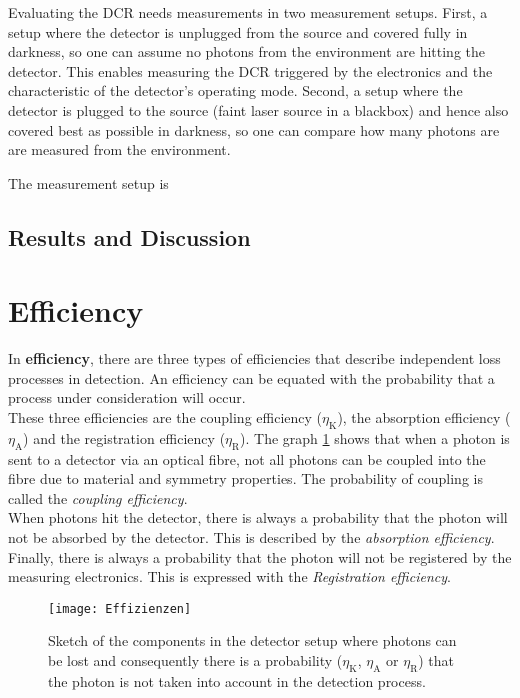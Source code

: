 Evaluating the DCR needs measurements in two measurement setups.
First, a setup where the detector is unplugged from the source and covered fully in darkness, so one can assume no
photons from the environment are hitting the detector.
This enables measuring the DCR triggered by the electronics and the characteristic of the detector's operating mode.
Second, a setup where the detector is plugged to the source (faint laser source in a blackbox) and hence also
covered best as possible in darkness, so one can compare how many photons are are measured from the environment.

The measurement setup is
\subsection*{Results and Discussion}

\section{Efficiency}
In \textbf{efficiency}, there are three types of efficiencies that describe independent loss processes in detection.
An efficiency can be equated with the probability that a process under consideration will occur.\\
These three efficiencies are the coupling efficiency ($\eta_{\text{K}}$),
the absorption efficiency ($\eta_{\text{A}}$) and the registration efficiency ($\eta_{\text{R}}$).
The graph \ref{fig: single_efficiency_terms} shows that when a photon is sent to a detector via an optical fibre,
not all photons can be coupled into the fibre due to material and symmetry properties.
The probability of coupling is called the \textit{coupling efficiency}. \\
When photons hit the detector, there is always a probability that the photon will not be absorbed by the detector.
This is described by the \textit{absorption efficiency}. \\
Finally, there is always a probability that the photon will not be registered by the measuring electronics.
This is expressed with the \textit{Registration efficiency}. \\

\begin{figure}[hhh]
\texttt{[image: Effizienzen]}
\caption{Sketch of the components in the detector setup where photons can be lost and consequently there is a probability ($\eta_{\text{K}}$, $\eta_{\text{A}}$ or $\eta_{\text{R}}$) that the photon is not taken into account in the detection process.}
\label{fig: single_efficiency_terms}
\end{figure}

